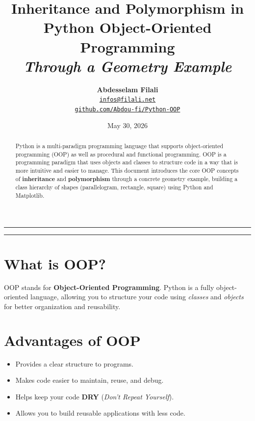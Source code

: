 \documentclass[11pt, a4paper]{article}
\title{%
  \vspace{-1cm}
  {\LARGE\bfseries\color{headcolor} Inheritance and Polymorphism in Python Object-Oriented Programming} \\[4pt]
  {\normalsize\itshape\color{pygray} Through a Geometry Example}
}
\author{%
  \textbf{Abdesselam Filali}\\[4pt]
  {\small \href{mailto:infos@filali.net}{\texttt{infos@filali.net}}}\\
  {\small \href{https://github.com/Abdou-fi/Python-OOP}{\texttt{github.com/Abdou-fi/Python-OOP}}}
}
\date{May 30, 2026}
\begin{document}
\maketitle
\thispagestyle{empty}

\vspace{0.5em}
\noindent\rule{\linewidth}{1pt}
\vspace{0.3em}

\begin{abstract}
\noindent
Python is a multi-paradigm programming language that supports object-oriented programming (OOP) as well as procedural and functional
programming. OOP is a programming paradigm that uses objects and classes to structure code in a way that is more intuitive and easier to manage.
This document introduces the core OOP concepts of \textbf{inheritance} and \textbf{polymorphism} through a concrete geometry example, building
a class hierarchy of shapes (parallelogram, rectangle, square) using Python and Matplotlib.
\end{abstract}

\vspace{0.5em}
\noindent\rule{\linewidth}{0.4pt}
\vspace{1em}

\tableofcontents

\newpage

\section{What is OOP?}

OOP stands for \textbf{Object-Oriented Programming}. Python is a fully object-oriented language, allowing you to structure your code using
\emph{classes} and \emph{objects} for better organization and reusability.

\section{Advantages of OOP}

\begin{itemize}[leftmargin=1.5em, itemsep=2pt]
  \item Provides a clear structure to programs.
  \item Makes code easier to maintain, reuse, and debug.
  \item Helps keep your code \textbf{DRY} (\emph{Don't Repeat Yourself}).
  \item Allows you to build reusable applications with less code.
\end{itemize}
\end{document}
